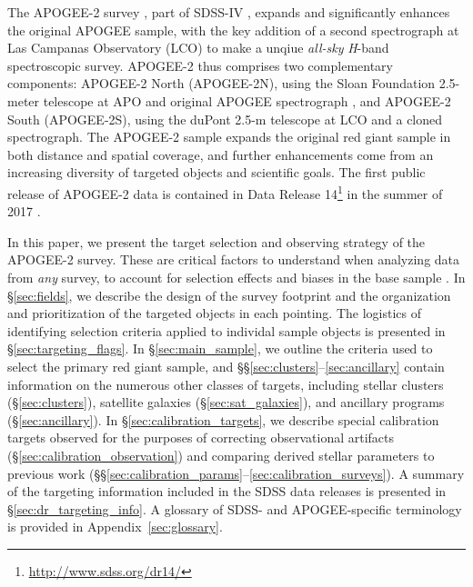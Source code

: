 \documentclass[12pt,twocolumn]{emulateapj}
\begin{document}
The APOGEE-2 survey \citep{Majewski_2016_apogee1-2}, part of SDSS-IV \citep[2014--2020;][]{Blanton_2017_sdss4}, expands and significantly enhances the original APOGEE sample,  with the key addition of a second spectrograph at Las Campanas Observatory (LCO) to make a unqiue {\it all-sky} {\it H}-band spectroscopic survey.  APOGEE-2 thus comprises two complementary components: APOGEE-2 North (APOGEE-2N), using the Sloan Foundation 2.5-meter telescope at APO \citep{Gunn_2006_sloantelescope} and original APOGEE spectrograph  \citep{Wilson_2012_apogee}, and APOGEE-2 South (APOGEE-2S), using the duPont 2.5-m telescope at LCO and a cloned spectrograph.  The APOGEE-2 sample expands the original red giant sample in both distance and spatial coverage, and further enhancements come from an increasing diversity of targeted objects and scientific goals.  The first public release of APOGEE-2 data is contained in Data Release 14\footnote{\url{http://www.sdss.org/dr14/}} in the summer of 2017 \citep{Abolfathi_2017_SDSSDR14}.

In this paper, we present the target selection and observing strategy of the APOGEE-2 survey.  These are critical factors to understand when analyzing data from {\it any} survey, to account for selection effects and biases in the base sample \citep[e.g.,][]{Schlesinger_2012_SEGUEMDF}.  In \S\ref{sec:fields}, we describe the design of the survey footprint and the organization and prioritization of the targeted objects in each pointing. The logistics of identifying selection criteria applied to individal sample objects is presented in \S\ref{sec:targeting_flags}.  In \S\ref{sec:main_sample}, we outline the criteria used to select the primary red giant sample, and \S\S\ref{sec:clusters}--\ref{sec:ancillary} contain information on the numerous other classes of targets, including stellar clusters (\S\ref{sec:clusters}), satellite galaxies (\S\ref{sec:sat_galaxies}), and ancillary programs (\S\ref{sec:ancillary}).  In \S\ref{sec:calibration_targets}, we describe special calibration targets observed for the purposes of correcting observational artifacts (\S\ref{sec:calibration_observation}) and comparing derived stellar parameters to previous work (\S\S\ref{sec:calibration_params}--\ref{sec:calibration_surveys}).  A summary of the targeting information included in the SDSS data releases is presented in \S\ref{sec:dr_targeting_info}.  A glossary of SDSS- and APOGEE-specific terminology is provided in Appendix~\ref{sec:glossary}.
\end{document}
